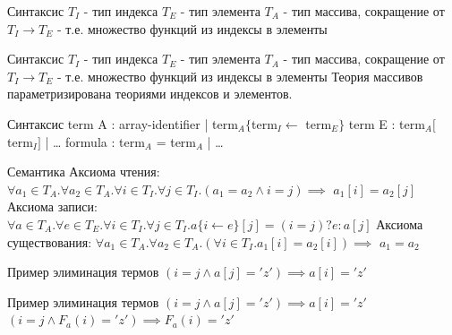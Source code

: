 \documentclass{beamer}
\begin{document}
\begin{frame}{Синтаксис}
$T_I$ - тип индекса\newline
$T_E$ - тип элемента\newline
$T_A$ - тип массива, сокращение от $T_I \rightarrow T_E$ - т.е. множество функций из индексы в элементы\newline
\end{frame}

\begin{frame}{Синтаксис}
$T_I$ - тип индекса\newline
$T_E$ - тип элемента\newline
$T_A$ - тип массива, сокращение от $T_I \rightarrow T_E$ - т.е. множество функций из индексы в элементы\newline
Теория массивов параметризирована теориями индексов и элементов.
\end{frame}

\begin{frame}{Синтаксис}
term A : array-identifier | term$_A\{$term$_I \leftarrow$ term$_E\}$\newline
term E : term$_A[$term$_I]$ | \dots\newline
formula : term$_A$ = term$_A$ | \dots\newline
\end{frame}

\begin{frame}{Семантика}
Аксиома чтения:
$\forall a_1 \in T_A. \forall a_2 \in T_A. \forall i \in T_I. \forall j \in T_I. (a_1 = a_2 \wedge i = j) \implies$\newline
$a_1[i] = a_2[j]$\newline
Аксиома записи:
$\forall a \in T_A. \forall e \in T_E. \forall i \in T_I. \forall j \in T_I. a\{i\leftarrow e\}[j] = (i = j)? e : a[j]$\newline
Аксиома существования:\newline
$\forall a_1 \in T_A. \forall a_2 \in T_A. (\forall i \in T_I. a_1[i] = a_2 [i]) \implies$\newline
$a_1 = a_2$
\end{frame}

\begin{frame}{Пример элиминация термов}
$(i = j \wedge a[j] = 'z') \implies a[i] = 'z'$\newline
\end{frame}

\begin{frame}{Пример элиминация термов}
$(i = j \wedge a[j] = 'z') \implies a[i] = 'z'$\newline
$(i = j \wedge F_a(i) = 'z') \implies F_a(i) = 'z'$\newline
\end{frame}
\end{document}
